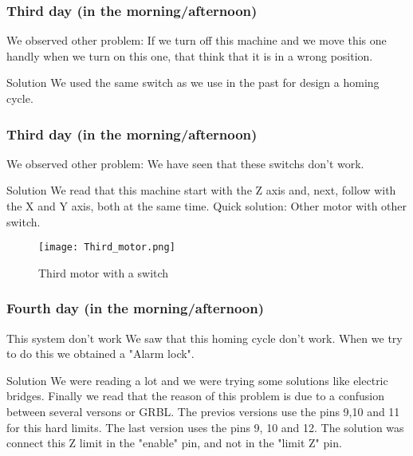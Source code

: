 \documentclass{beamer}
\begin{document}
\begin{frame}
\frametitle{Third day (in the morning/afternoon)}
\begin{alertblock}{We observed other problem:}
If we turn off this machine and we move this one handly when we turn on this one, that think that it is in a wrong position.
\end{alertblock}

\begin{block}{Solution}
We used the same switch as we use in the past for design a homing cycle.
\end{block}
 
\end{frame}

\begin{frame}
\frametitle{Third day (in the morning/afternoon)}
\begin{alertblock}{We observed other problem:}
We have seen that these switchs don't work. 
\end{alertblock}

\begin{block}{Solution}
We read that this machine start with the Z axis and, next, follow with the X and Y axis, both at the same time. Quick solution: Other motor with other switch.
\end{block}
 
\begin{figure}[hbtp]
\centering
\texttt{[image: Third\_motor.png]}
\caption{Third motor with a switch}
\end{figure} 
 
\end{frame}


\begin{frame}
\frametitle{Fourth day (in the morning/afternoon)}

\begin{alertblock}{This system don't work}
We saw that this homing cycle don't work. When we try to do this we obtained a "Alarm lock".
\end{alertblock}

\begin{block}{Solution}
We were reading a lot and we were trying some solutions like electric bridges. Finally we read that the reason of this problem is due to a confusion between several versons or GRBL. The previos versions use the pins 9,10 and 11 for this hard limits. The last version uses the pins 9, 10 and 12.
The solution was connect this Z limit in the "enable" pin, and not in the "limit Z" pin.
\end{block}

\end{frame}
\end{document}
